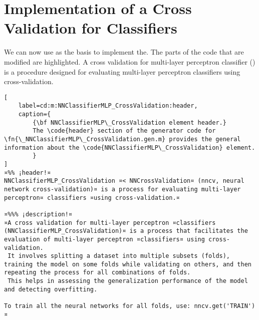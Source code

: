 \documentclass{tufte-handout}
\begin{document}
\clearpage
\section{Implementation of a Cross Validation for Classifiers}

We can now use  as the basis to implement the. The parts of the code that are modified are highlighted.
A cross validation for multi-layer perceptron classifier () is a procedure designed for evaluating multi-layer perceptron classifiers using cross-validation. 

\begin{lstlisting}[
	label=cd:m:NNClassifierMLP_CrossValidation:header,
	caption={
		{\bf NNClassifierMLP\_CrossValidation element header.}
		The \code{header} section of the generator code for \fn{\_NNClassifierMLP\_CrossValidation.gen.m} provides the general information about the \code{NNClassifierMLP\_CrossValidation} element.
		}
]
¤%% ¡header!¤
NNClassifierMLP_CrossValidation ¤< NNCrossValidation¤ (nncv, neural network cross-validation)¤ is a process for evaluating multi-layer perceptron¤ classifiers ¤using cross-validation.¤

¤%%% ¡description!¤
¤A cross validation for multi-layer perceptron ¤classifiers (NNClassifierMLP_CrossValidation)¤ is a process that facilitates the evaluation of multi-layer perceptron ¤classifiers¤ using cross-validation. 
 It involves splitting a dataset into multiple subsets (folds), training the model on some folds while validating on others, and then repeating the process for all combinations of folds. 
 This helps in assessing the generalization performance of the model and detecting overfitting.

To train all the neural networks for all folds, use: nncv.get('TRAIN')¤

\end{lstlisting}
\end{document}
